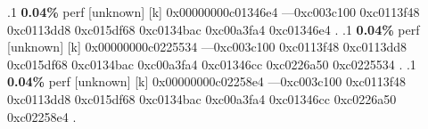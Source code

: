 \begin{profile}
{.1 \textbf{ 0.04\%} perf             [unknown]              [k] 0x00000000c01346e4\newline {} ---0xc003c100\newline {} 0xc0113f48\newline {} 0xc0113dd8\newline {} 0xc015df68\newline {} 0xc0134bac\newline {} 0xc00a3fa4\newline {} 0xc01346e4\newline {} . 
.1 \textbf{ 0.04\%} perf             [unknown]              [k] 0x00000000c0225534\newline {} ---0xc003c100\newline {} 0xc0113f48\newline {} 0xc0113dd8\newline {} 0xc015df68\newline {} 0xc0134bac\newline {} 0xc00a3fa4\newline {} 0xc01346cc\newline {} 0xc0226a50\newline {} 0xc0225534\newline {} . 
.1 \textbf{ 0.04\%} perf             [unknown]              [k] 0x00000000c02258e4\newline {} ---0xc003c100\newline {} 0xc0113f48\newline {} 0xc0113dd8\newline {} 0xc015df68\newline {} 0xc0134bac\newline {} 0xc00a3fa4\newline {} 0xc01346cc\newline {} 0xc0226a50\newline {} 0xc02258e4\newline {} . 
}
\end{profile}
